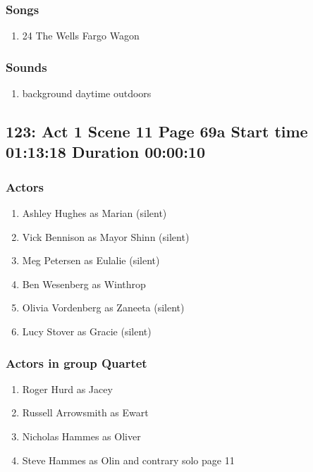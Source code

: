 \subsubsection{Songs}
\begin{enumerate}
\item 24 The Wells Fargo Wagon
\end{enumerate}\subsubsection{Sounds}
\begin{enumerate}
\item background daytime outdoors
\end{enumerate}
\subsection{123: Act 1 Scene 11 Page 69a Start time 01:13:18 Duration 00:00:10}

\subsubsection{Actors}
\begin{enumerate}
\item Ashley Hughes as Marian (silent)
\item Vick Bennison as Mayor Shinn (silent)
\item Meg Petersen as Eulalie (silent)
\item Ben Wesenberg as Winthrop
\item Olivia Vordenberg as Zaneeta (silent)
\item Lucy Stover as Gracie (silent)
\end{enumerate}
\subsubsection{Actors in group Quartet}
\begin{enumerate}
\item Roger Hurd as Jacey
\item Russell Arrowsmith as Ewart
\item Nicholas Hammes as Oliver
\item Steve Hammes as Olin and contrary solo page 11
\end{enumerate}
